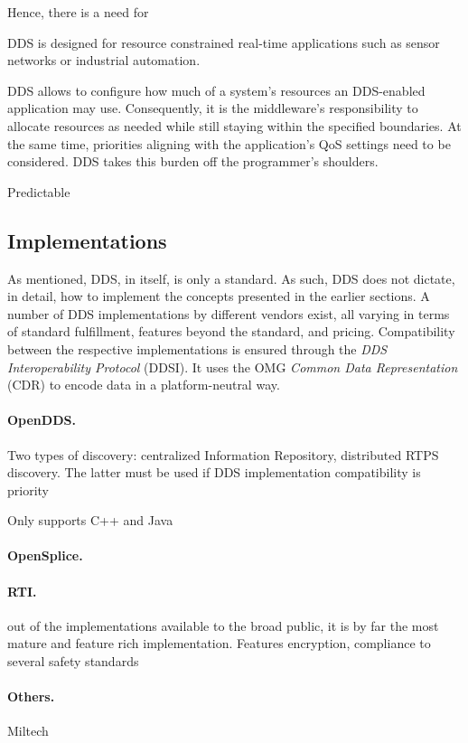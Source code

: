 Hence, there is a need for 

DDS is designed for resource constrained real-time applications such as sensor networks or industrial automation.

DDS allows to configure how much of a system's resources an DDS-enabled application may use. Consequently, it is the middleware's responsibility to allocate resources as needed while still staying within the specified boundaries. At the same time, priorities aligning with the application's QoS settings need to be considered. DDS takes this burden off the programmer's shoulders.

Predictable


\subsection{Implementations}
As mentioned, DDS, in itself, is only a standard. As such, DDS does not dictate, in detail, how to implement the concepts presented in the earlier sections. A number of DDS implementations by different vendors exist, all varying in terms of standard fulfillment, features beyond the standard, and pricing. Compatibility between the respective implementations is ensured through the \emph{DDS Interoperability Protocol} (DDSI). It uses the OMG \emph{Common Data Representation} (CDR) to encode data in a platform-neutral way. 

\paragraph{OpenDDS.}
Two types of discovery: centralized Information Repository, distributed RTPS discovery. The latter must be used if DDS implementation compatibility is priority

Only supports C++ and Java

\paragraph{OpenSplice.}


\paragraph{RTI.}
out of the implementations available to the broad public, it is by far the most mature and feature rich implementation.
Features encryption, compliance to several safety standards

\paragraph{Others.}
Miltech